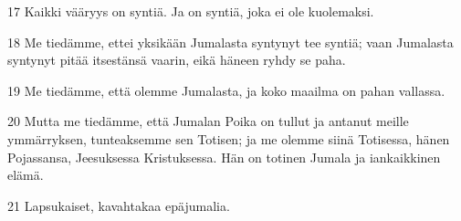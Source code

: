 \par 17 Kaikki vääryys on syntiä. Ja on syntiä, joka ei ole kuolemaksi.
\par 18 Me tiedämme, ettei yksikään Jumalasta syntynyt tee syntiä; vaan Jumalasta syntynyt pitää itsestänsä vaarin, eikä häneen ryhdy se paha.
\par 19 Me tiedämme, että olemme Jumalasta, ja koko maailma on pahan vallassa.
\par 20 Mutta me tiedämme, että Jumalan Poika on tullut ja antanut meille ymmärryksen, tunteaksemme sen Totisen; ja me olemme siinä Totisessa, hänen Pojassansa, Jeesuksessa Kristuksessa. Hän on totinen Jumala ja iankaikkinen elämä.
\par 21 Lapsukaiset, kavahtakaa epäjumalia.


